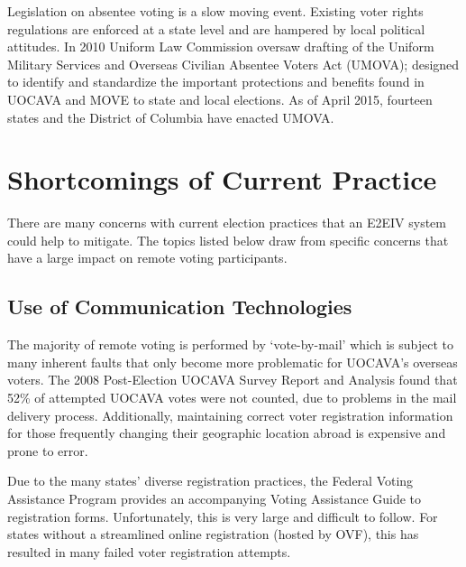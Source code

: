 Legislation on absentee voting is a slow moving event. Existing voter
rights regulations are enforced at a state level and are hampered by local
political attitudes. In 2010 Uniform Law Commission oversaw drafting of the
Uniform Military Services and Overseas Civilian Absentee Voters Act (UMOVA);
designed to identify and standardize the important protections and benefits
found in UOCAVA and MOVE to state and local elections. As of April 2015,
fourteen states and the District of Columbia have enacted UMOVA.

\section{Shortcomings of Current Practice}

There are many concerns with current election practices that an E2EIV system
could help to mitigate. The topics listed below draw from specific concerns
that have a large impact on remote voting participants.

\subsection{Use of Communication Technologies}
The majority of remote voting is performed by `vote-by-mail' which is
subject to many inherent faults that only become more problematic for UOCAVA's
overseas voters. The 2008 Post-Election UOCAVA Survey Report and Analysis
found that 52\% of attempted UOCAVA votes were not counted, due to problems
in the mail delivery process. Additionally, maintaining correct voter
registration information for those frequently changing their geographic
location abroad is expensive and prone to error.


Due to the many states' diverse registration practices, the Federal Voting
Assistance Program provides an accompanying Voting Assistance Guide to
registration forms. Unfortunately, this is very large and difficult to follow.
For states without a streamlined online registration (hosted by OVF), this has
resulted in many failed voter registration attempts.


